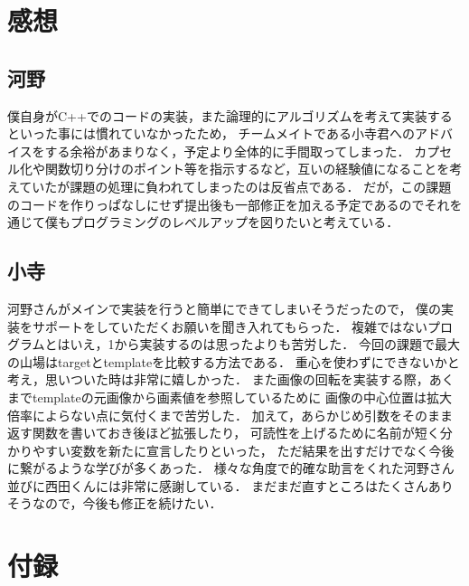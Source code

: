 \documentclass[platex,dvipdfmx]{jsarticle}
\begin{document}
\newpage

\section{感想}
\subsection{河野}
僕自身がC++でのコードの実装，また論理的にアルゴリズムを考えて実装するといった事には慣れていなかったため，
チームメイトである小寺君へのアドバイスをする余裕があまりなく，予定より全体的に手間取ってしまった．
カプセル化や関数切り分けのポイント等を指示するなど，互いの経験値になることを考えていたが課題の処理に負われてしまったのは反省点である．
だが，この課題のコードを作りっぱなしにせず提出後も一部修正を加える予定であるのでそれを通じて僕もプログラミングのレベルアップを図りたいと考えている．

\subsection{小寺}
河野さんがメインで実装を行うと簡単にできてしまいそうだったので，
僕の実装をサポートをしていただくお願いを聞き入れてもらった．
複雑ではないプログラムとはいえ，1から実装するのは思ったよりも苦労した．
今回の課題で最大の山場はtargetとtemplateを比較する方法である．
重心を使わずにできないかと考え，思いついた時は非常に嬉しかった．
また画像の回転を実装する際，あくまでtemplateの元画像から画素値を参照しているために
画像の中心位置は拡大倍率によらない点に気付くまで苦労した．
加えて，あらかじめ引数をそのまま返す関数を書いておき後ほど拡張したり，
可読性を上げるために名前が短く分かりやすい変数を新たに宣言したりといった，
ただ結果を出すだけでなく今後に繋がるような学びが多くあった．
様々な角度で的確な助言をくれた河野さん並びに西田くんには非常に感謝している．
まだまだ直すところはたくさんありそうなので，今後も修正を続けたい．


\section*{付録}

\end{document}
